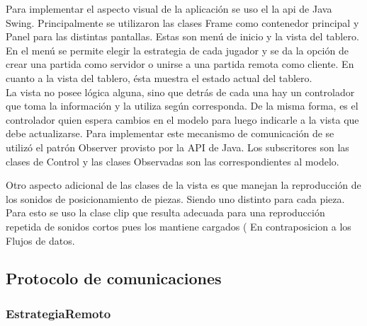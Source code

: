 \documentclass[11pt]{article}
\begin{document}
Para implementar el aspecto visual de la aplicaci\'on se uso el la api de Java Swing. Principalmente se utilizaron las clases Frame como contenedor principal y Panel para las distintas pantallas. 
Estas son men\'u de inicio y  la vista del tablero.
En el men\'u se permite elegir la estrategia de cada jugador y se da la opci\'on de crear una partida como servidor o unirse a una partida remota como cliente.
En cuanto a la vista del tablero, \'esta muestra el estado actual del tablero. \\
La vista no posee l\'ogica alguna, sino que detr\'as de cada una hay un controlador que toma la informaci\'on y la utiliza seg\'un corresponda. 
De la misma forma, es el controlador quien espera cambios en el modelo para luego indicarle a la vista que debe actualizarse. Para implementar este mecanismo de comunicaci\'on de se utiliz\'o el patr\'on Observer provisto por la API de Java. Los subscritores son las clases de Control y las clases Observadas son las correspondientes al modelo.

Otro aspecto adicional de las clases de la vista es que manejan la reproducción de los sonidos de posicionamiento de piezas. Siendo uno distinto para cada pieza. Para esto se uso la clase clip que resulta adecuada para una reproducci\'on repetida de sonidos cortos pues los mantiene cargados ( En contraposicion a los Flujos de datos.


\subsection{Protocolo de comunicaciones}
\label{sec-4.2}
  
\subsubsection{EstrategiaRemoto}
\label{sec-4.2.1}
\end{document}
